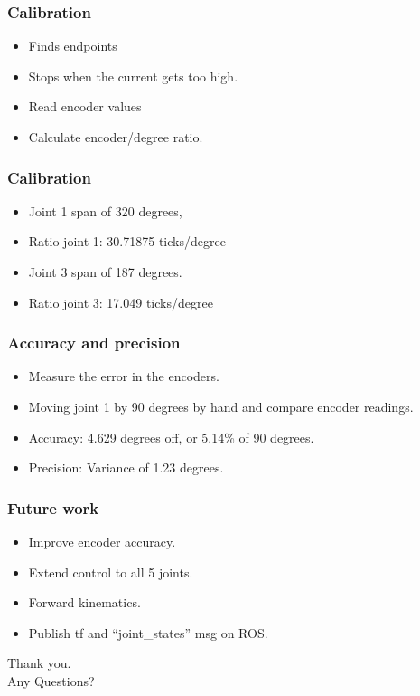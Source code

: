 \documentclass{beamer}
\begin{document}
  \begin{frame}
	\frametitle{Calibration}
	  \begin{itemize}
      	\item Finds endpoints
      	\item Stops when the current gets too high.
      	\item Read encoder values
      	\item Calculate encoder/degree ratio.
      \end{itemize}
  \end{frame}
  
    \begin{frame}
	\frametitle{Calibration}
	  \begin{itemize}
      	\item Joint 1 span of 320 degrees, 
      	\item Ratio joint 1: 30.71875 ticks/degree
      	\item Joint 3 span of 187 degrees.
      	\item Ratio joint 3: 17.049 ticks/degree
      \end{itemize}
  \end{frame}
    
  \begin{frame}
    \frametitle{Accuracy and precision}
    \begin{itemize}
      \item Measure the error in the encoders.
      \item Moving joint 1 by 90 degrees by hand and compare encoder readings.
      \item Accuracy: 4.629 degrees off, or 5.14\% of 90 degrees.
      \item Precision: Variance of 1.23 degrees.
	\end{itemize}
  \end{frame}
  
  \begin{frame}
    \frametitle{Future work}
    \begin{itemize}
    \item Improve encoder accuracy.
    \item Extend control to all 5 joints.
    \item Forward kinematics.
    \item Publish tf and ``joint\_states'' msg on ROS.
    \end{itemize}
  \end{frame}

  \begin{frame}
    \centering
    \huge
    Thank you. \\
    \vspace{0.5in}
     Any Questions?
  \end{frame}
\end{document}
